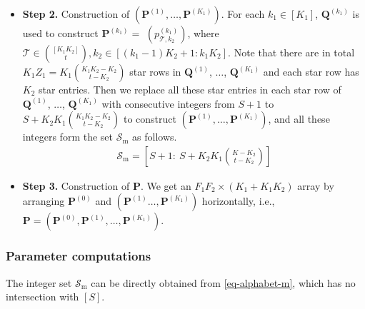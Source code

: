 \documentclass[onecolumn,10pt]{IEEEtran}
\theoremstyle{mythm}
\begin{document}
{\begin{itemize}
\item {\bf Step 2.} Construction of $(\mathbf{P}^{(1)},\ldots,\mathbf{P}^{(K_1)})$. For each $k_1\in[K_1]$,   $\mathbf{Q}^{(k_1)}$ is used to construct $\mathbf{P}^{(k_1)}=$ $(p^{(k_1)}_{\mathcal{T},k_2})$, where $ \mathcal{T}\in {[K_1K_2]\choose t}, k_2\in[(k_1-1)K_2+1:k_1K_2]$. Note that there are in total $K_1Z_1=K_1{K_1K_2-K_2\choose t-K_2}$ star rows in $\mathbf{Q}^{(1)}$, $\ldots$, $\mathbf{Q}^{(K_1)}$ and each star row has $K_2$ star entries. Then we replace all these star entries in each star row of $\mathbf{Q}^{(1)}$, $\ldots$, $\mathbf{Q}^{(K_1)}$ with consecutive integers from $S+1$ to $S+K_2K_1{K_1K_2-K_2\choose t-K_2}$ to construct $(\mathbf{P}^{(1)},\ldots,\mathbf{P}^{(K_1)})$, and all these integers form the set $\mathcal{S}_{\text{m}}$ as follows.
\begin{eqnarray}
\label{eq-alphabet-m}
\mathcal{S}_{\text{m}}=\left[S+1:\ S+K_2K_1{K-K_2\choose t-K_2}\right]
\end{eqnarray}
\item{\bf Step 3.} Construction of $\mathbf{P}$. We get an $F_1F_2\times (K_1+K_1K_2)$ array by arranging $\mathbf{P}^{(0)}$ and $(\mathbf{P}^{(1)}\ldots, \mathbf{P}^{(K_1)} )$ horizontally, i.e., $\mathbf{P}=\left(\mathbf{P}^{(0)}, \mathbf{P}^{(1)}, \ldots, \mathbf{P}^{(K_1)}\right)$.
\end{itemize}
\subsubsection{Parameter computations} The integer set $\mathcal{S}_{\text{m}}$ can be directly obtained from \eqref{eq-alphabet-m}, which has no intersection with $[S]$.

}
\end{document}
